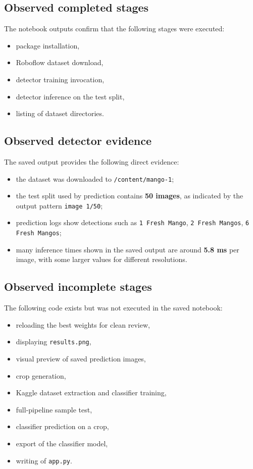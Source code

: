 \documentclass[12pt,a4paper]{article}
\begin{document}
\subsection{Observed completed stages}
The notebook outputs confirm that the following stages were executed:
\begin{itemize}
    \item package installation,
    \item Roboflow dataset download,
    \item detector training invocation,
    \item detector inference on the test split,
    \item listing of dataset directories.
\end{itemize}

\subsection{Observed detector evidence}
The saved output provides the following direct evidence:
\begin{itemize}
    \item the dataset was downloaded to \texttt{/content/mango-1};
    \item the test split used by prediction contains \textbf{50 images}, as indicated by the output pattern \texttt{image 1/50};
    \item prediction logs show detections such as \texttt{1 Fresh Mango}, \texttt{2 Fresh Mangos}, \texttt{6 Fresh Mangos};
    \item many inference times shown in the saved output are around \textbf{5.8 ms} per image, with some larger values for different resolutions.
\end{itemize}

\subsection{Observed incomplete stages}
The following code exists but was not executed in the saved notebook:
\begin{itemize}
    \item reloading the best weights for clean review,
    \item displaying \texttt{results.png},
    \item visual preview of saved prediction images,
    \item crop generation,
    \item Kaggle dataset extraction and classifier training,
    \item full-pipeline sample test,
    \item classifier prediction on a crop,
    \item export of the classifier model,
    \item writing of \texttt{app.py}.
\end{itemize}
\end{document}
